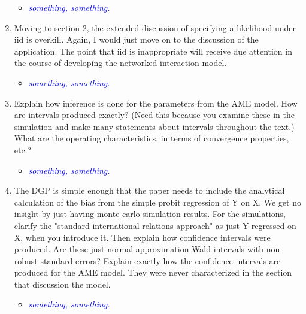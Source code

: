 \begin{enumerate}
	\begin{itemize}
		\item  \emph{ \textcolor{blue}{
		something, something.
		}}
	\end{itemize}
	\item Moving to section 2, the extended discussion of specifying a likelihood under iid is overkill.  Again, I would just move on to the discussion of the application. The point that iid is inappropriate will receive due attention in the course of developing the networked interaction model.
	\begin{itemize}
		\item  \emph{ \textcolor{blue}{
		something, something.
		}}
	\end{itemize}
	\item Explain how inference is done for the parameters from the AME model. How are intervals produced exactly? (Need this because you examine these in the simulation and make many statements about intervals throughout the text.)  What are the operating characteristics, in terms of convergence properties, etc.?
	\begin{itemize}
		\item  \emph{ \textcolor{blue}{
		something, something.
		}}
	\end{itemize}
	\item The DGP is simple enough that the paper needs to include the analytical calculation of the bias from the simple probit regression of Y on X.  We get no insight by just having monte carlo simulation results. For the simulations, clarify the "standard international relations approach" as just Y regressed on X, when you introduce it. Then explain how confidence intervals were produced. Are these just normal-approximation Wald intervals with non-robust standard errors? Explain exactly how the confidence intervals are produced for the AME model.  They were never characterized in the section that discussion the model.
	\begin{itemize}
		\item  \emph{ \textcolor{blue}{
		something, something.
		}}
	\end{itemize}		
\end{enumerate}
